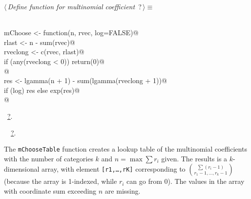 \documentclass[reqno]{amsart}
\renewcommand{\NWtarget}[2]{\hypertarget{#1}{#2}}
\renewcommand{\NWlink}[2]{\hyperlink{#1}{#2}}
\begin{document}
\begin{flushleft} \small
\begin{minipage}{\linewidth}\label{scrap46}\raggedright\small
\NWtarget{nuweb?}{} $\langle\,${\itshape Define function for multinomial coefficient}\nobreak\ {\footnotesize {?}}$\,\rangle\equiv$
\vspace{-1ex}
\begin{list}{}{} \item
\mbox{}\verb@@\\
\mbox{}\verb@    mChoose <- function(n, rvec, log=FALSE){@\\
\mbox{}\verb@      rlast <- n - sum(rvec)@\\
\mbox{}\verb@      rveclong <- c(rvec, rlast)@\\
\mbox{}\verb@      if (any(rveclong < 0)) return(0)@\\
\mbox{}\verb@      @\\
\mbox{}\verb@      res <- lgamma(n + 1) - sum(lgamma(rveclong + 1))@\\
\mbox{}\verb@      if (log) res else exp(res)@\\
\mbox{}\verb@    }@\\
\mbox{}\verb@@{\NWsep}
\end{list}
\vspace{-1.5ex}
\footnotesize
\begin{list}{}{\setlength{\itemsep}{-\parsep}\setlength{\itemindent}{-\leftmargin}}
\item \NWtxtMacroRefIn\ \NWlink{nuweb?}{?}.
\item \NWtxtIdentsDefed\nobreak\  \verb@mChoose@\nobreak\ \NWlink{nuweb?}{?}.
\item{}
\end{list}
\end{minipage}\vspace{4ex}
\end{flushleft}
The \texttt{mChooseTable} function creates a lookup table of the multinomial coefficients 
with the number of categories $k$ and $n=\max \sum r_i$ given. The results is a $k$-dimensional array, with element
\texttt{[r1,\ldots,rK]} corresponding to $\binom{\sum (r_i-1)}{r_1-1,\ldots,r_k-1}$ (because the array is 1-indexed, while
$r_i$ can go from 0). The values in the array with coordinate sum exceeding $n$ are missing.
 
\end{document}
